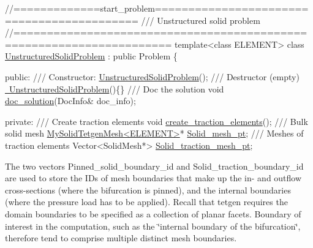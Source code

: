  
\begin{DoxyCodeInclude}
\textcolor{comment}{//=============start\_problem===========================================}
\textcolor{comment}{/// Unstructured solid problem}
\textcolor{comment}{}\textcolor{comment}{//=====================================================================}
\textcolor{keyword}{template}<\textcolor{keyword}{class} ELEMENT>
\textcolor{keyword}{class }\hyperlink{classUnstructuredSolidProblem}{UnstructuredSolidProblem} : \textcolor{keyword}{public} Problem
\{

\textcolor{keyword}{public}:
\textcolor{comment}{}
\textcolor{comment}{ /// Constructor: }
\textcolor{comment}{} \hyperlink{classUnstructuredSolidProblem_a18ce02b6e4bbc86403c9e1b32c095772}{UnstructuredSolidProblem}();
\textcolor{comment}{}
\textcolor{comment}{ /// Destructor (empty)}
\textcolor{comment}{} \hyperlink{classUnstructuredSolidProblem_a25fe105d949498bf8f7c15aff96a7d00}{~UnstructuredSolidProblem}()\{\}
\textcolor{comment}{}
\textcolor{comment}{ /// Doc the solution}
\textcolor{comment}{} \textcolor{keywordtype}{void} \hyperlink{classUnstructuredSolidProblem_ab3d66fd61b69d12b4f159d763fc44f15}{doc\_solution}(DocInfo& doc\_info);
 
\textcolor{keyword}{private}:
\textcolor{comment}{}
\textcolor{comment}{ /// Create traction elements}
\textcolor{comment}{} \textcolor{keywordtype}{void} \hyperlink{classUnstructuredSolidProblem_a9137960284200ed998989f785965f902}{create\_traction\_elements}();
\textcolor{comment}{}
\textcolor{comment}{ /// Bulk solid mesh}
\textcolor{comment}{} \hyperlink{classMySolidTetgenMesh}{MySolidTetgenMesh<ELEMENT>}* \hyperlink{classUnstructuredSolidProblem_ad6a8cbe2c2f3596385e1a2484bfb68f7}{Solid\_mesh\_pt};
\textcolor{comment}{}
\textcolor{comment}{ /// Meshes of traction elements}
\textcolor{comment}{} Vector<SolidMesh*> \hyperlink{classUnstructuredSolidProblem_a32e691a698667053003e21333fc65057}{Solid\_traction\_mesh\_pt};

\end{DoxyCodeInclude}


The two vectors {\ttfamily Pinned\+\_\+solid\+\_\+boundary\+\_\+id} and {\ttfamily Solid\+\_\+traction\+\_\+boundary\+\_\+id} are used to store the I\+Ds of mesh boundaries that make up the in-\/ and outflow cross-\/sections (where the bifurcation is pinned), and the internal boundaries (where the pressure load has to be applied). Recall that {\ttfamily tetgen} requires the domain boundaries to be specified as a collection of planar facets. Boundary of interest in the computation, such as the \char`\"{}internal boundary of the
bifurcation\char`\"{}, therefore tend to comprise multiple distinct mesh boundaries.


